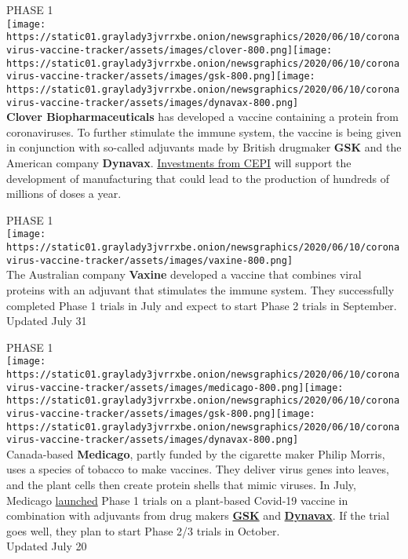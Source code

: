 PHASE 1\\
\texttt{[image: https://static01.graylady3jvrrxbe.onion/newsgraphics/2020/06/10/coronavirus-vaccine-tracker/assets/images/clover-800.png]}\texttt{[image: https://static01.graylady3jvrrxbe.onion/newsgraphics/2020/06/10/coronavirus-vaccine-tracker/assets/images/gsk-800.png]}\texttt{[image: https://static01.graylady3jvrrxbe.onion/newsgraphics/2020/06/10/coronavirus-vaccine-tracker/assets/images/dynavax-800.png]}\\
\textbf{Clover Biopharmaceuticals} has developed a vaccine containing a
protein from coronaviruses. To further stimulate the immune system, the
vaccine is being given in conjunction with so-called adjuvants made by
British drugmaker \textbf{GSK} and the American company
\textbf{Dynavax}.
\href{https://cepi.net/news_cepi/cepi-expands-partnership-with-clover-biopharmaceuticals-to-rapidly-advance-development-and-manufacture-of-covid-19-vaccine-candidate/}{Investments
from CEPI} will support the development of manufacturing that could lead
to the production of hundreds of millions of doses a year.

PHASE 1\\
\texttt{[image: https://static01.graylady3jvrrxbe.onion/newsgraphics/2020/06/10/coronavirus-vaccine-tracker/assets/images/vaxine-800.png]}\\
The Australian company \textbf{Vaxine} developed a vaccine that combines
viral proteins with an adjuvant that stimulates the immune system. They
successfully completed Phase 1 trials in July and expect to start Phase
2 trials in September.\\
Updated July 31

PHASE 1\\
\texttt{[image: https://static01.graylady3jvrrxbe.onion/newsgraphics/2020/06/10/coronavirus-vaccine-tracker/assets/images/medicago-800.png]}\texttt{[image: https://static01.graylady3jvrrxbe.onion/newsgraphics/2020/06/10/coronavirus-vaccine-tracker/assets/images/gsk-800.png]}\texttt{[image: https://static01.graylady3jvrrxbe.onion/newsgraphics/2020/06/10/coronavirus-vaccine-tracker/assets/images/dynavax-800.png]}\\
Canada-based \textbf{Medicago}, partly funded by the cigarette maker
Philip Morris, uses a species of tobacco to make vaccines. They deliver
virus genes into leaves, and the plant cells then create protein shells
that mimic viruses. In July, Medicago
\href{https://www.medicago.com/en/newsroom/medicago-begins-phase-i-clinical-trials-for-its-covid-19-vaccine-candidate/}{launched}
Phase 1 trials on a plant-based Covid-19 vaccine in combination with
adjuvants from drug makers
\textbf{\href{https://www.medicago.com/en/newsroom/gsk-and-medicago-announce-collaboration-to-develop-a-novel-adjuvanted-covid-19-candidate-vaccine/}{GSK}}
and
\textbf{\href{https://www.medicago.com/en/newsroom/dynavax-and-medicago-announce-collaboration-to-develop-a-novel-adjuvanted-covid-19-vaccine-candidate/}{Dynavax}}.
If the trial goes well, they plan to start Phase 2/3 trials in
October.\\
Updated July 20

